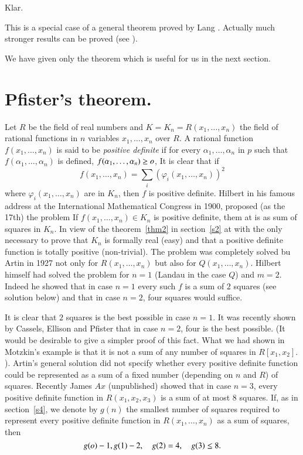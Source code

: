 \begin{prf}
Klar.


This is a special case of a general theorem proved by Lang
\cite{key11}. Actually much stronger results can be proved (see
\cite{key6}).

We have given only the theorem which is useful for us in the next
section.
\enprf
\end{prf}

\section{Pfister's theorem.}\label{s6}

Let  $R$ be the field of real numbers and $K=K_n=R(x_1,\ldots,x_n)$
the field of rational functions in $n$ variables $x_1,\ldots,x_n$ over
$R$. A rational function $f(x_1,\ldots,x_n)$ is said to be \textit{positive
definite} if for every $\alpha_1,\ldots,\alpha_n$ in $p$ such that
$f(\alpha_1,\ldots,\alpha_n)$ is defined,
$f(\alpha_1,\ldots,\alpha_n)\geq o$, It is clear that if 
$$
f(x_1,\ldots,x_n)=\sum\limits_{i}(\varphi_i(x_1,\ldots,x_n))^{2}
$$
where $\varphi_i(x_1,\ldots,x_n)$ are in $K_n$, then $f$ is positive
definite. Hilbert in his famous address at the International
Mathematical Congress in 1900, proposed (as the 17th) the problem If
$f(x_1,\ldots,x_n)\in K_n$ is positive definite, them at is as sum of
squares in $K_n$. In view of the theorem~\ref{thm2} in section~\ref{s2} at with the only necessary to prove that $K_n$ is formally
real (easy) and that a positive definite function is totally positive
(non-trivial). The problem was completely solved bu Artin \cite{key1} in 1927
not only for $R(x_1,\ldots,x_n)$ but also for
$Q(x_1,\ldots,x_n)$. Hilbert \cite{key8} himself had solved the
problem for $n=1$ (Landau \cite{key10} in the case $Q$) and
$m=2$. Indeed he showed that in case $n=1$ every such $f$ is a sum of
$2$ squares (see solution below) and that in case $n=2$, four squares
would suffice.

It is clear that $2$ squares is the best possible in case $n=1$. It
was recently shown by Cassels, Ellison and Pfister \cite{key4} that
in case $n=2$, four is the best possible. (It would be desirable to
give a simpler proof of this fact. What we had shown in Motzkin's
example is that it is not a sum of any number of squares in
$R[x_1,x_2].$). Artin's general solution did not specify whether every
positive definite function could be represented as a sum of a fixed
number (depending on $n$ and $R$) of squares. Recently James $Ax$
(unpublished) showed that in case $n=3$, every positive definite
function in $R(x_1,x_2,x_3)$ is a sum of at most $8$ squares. If, as
in section~\ref{s4}, we denote by $g(n)$ the smallest number of
squares required to represent every positive definite function in
$R(x_1,\ldots,x_n)$ as a sum of squares, then 
$$
g(o)-1, g(1)-2,\quad g(2)=4, \quad g(3)\leq 8.
$$

